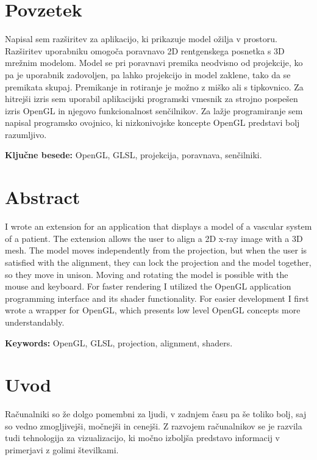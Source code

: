 \documentclass[a4paper, 12pt]{book}
\newcommand{\tkeywords}{OpenGL, GLSL, projekcija, poravnava, senčilniki}
\newcommand{\tkeywordsEn}{OpenGL, GLSL, projection, alignment, shaders}
\newcommand{\clearemptydoublepage}{\newpage{\pagestyle{empty}\cleardoublepage}}
\begin{document}
\clearemptydoublepage

\chapter*{Povzetek}
Napisal sem razširitev za aplikacijo, ki prikazuje model ožilja v prostoru. Razširitev uporabniku omogoča poravnavo 2D rentgenskega posnetka s 3D mrežnim modelom. Model se pri poravnavi premika neodvisno od projekcije, ko pa je uporabnik zadovoljen, pa lahko projekcijo in model zaklene, tako da se premikata skupaj. Premikanje in rotiranje je možno z miško ali s tipkovnico. Za hitrejši izris sem uporabil aplikacijski programski vmesnik za strojno pospešen izris OpenGL in njegovo funkcionalnost senčilnikov. Za lažje programiranje sem napisal programsko ovojnico, ki nizkonivojske koncepte OpenGL predstavi bolj razumljivo. 

\bigskip

\noindent\textbf{Ključne besede: } \tkeywords.
\clearemptydoublepage

\chapter*{Abstract}
I wrote an extension for an application that displays a model of a vascular system of a patient. The extension allows the user to align a 2D x-ray image with a 3D mesh. The model moves independently from the projection, but when the user is satisfied with the alignment, they can lock the projection and the model together, so they move in unison. Moving and rotating the model is possible with the mouse and keyboard. For faster rendering I utilized the OpenGL application programming interface and its shader functionality. For easier development I first wrote a wrapper for OpenGL, which presents low level OpenGL concepts more understandably.
\bigskip

\noindent\textbf{Keywords:} \tkeywordsEn.
\clearemptydoublepage

\mainmatter
\setcounter{page}{1}
\pagestyle{fancy}

\chapter{Uvod}
Računalniki so že dolgo pomembni za ljudi, v zadnjem času pa še toliko bolj, saj so vedno zmogljivejši, močnejši in cenejši. Z razvojem računalnikov se je razvila tudi tehnologija za vizualizacijo, ki močno izboljša predstavo informacij v primerjavi z golimi številkami. 
\end{document}
